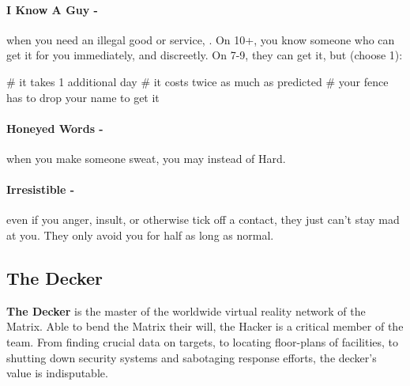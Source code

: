 \paragraph{I Know A Guy -} when you need an illegal good or service, . On 10+, you know someone who can get it for you immediately, and discreetly. On 7-9, they can get it, but (choose 1):
    \begin{easylist}
        # it takes 1 additional day
        # it costs twice as much as predicted
        # your fence has to drop your name to get it
    \end{easylist}

\paragraph{Honeyed Words -} when you make someone sweat, you may  instead of Hard.

\paragraph{Irresistible -} even if you anger, insult, or otherwise tick off a contact, they just can’t stay mad at you. They only avoid you for half as long as normal.



\clearpage
\subsection{The Decker}
\textbf{The Decker} is the master of the worldwide virtual reality network of the Matrix. Able to bend the Matrix their will, the Hacker is a critical member of the team. From finding crucial data on targets, to locating floor-plans of facilities, to shutting down security systems and sabotaging response efforts, the decker’s value is indisputable.

